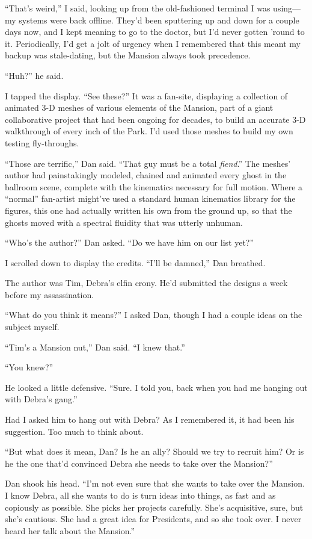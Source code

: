 “That's weird,” I said, looking up from the old-fashioned terminal
I was using—my systems were back offline. They'd been sputtering up
and down for a couple days now, and I kept meaning to go to the
doctor, but I'd never gotten 'round to it. Periodically, I'd get a
jolt of urgency when I remembered that this meant my backup was
stale-dating, but the Mansion always took precedence.

“Huh?” he said.

I tapped the display. “See these?” It was a fan-site, displaying a
collection of animated 3-D meshes of various elements of the
Mansion, part of a giant collaborative project that had been
ongoing for decades, to build an accurate 3-D walkthrough of every
inch of the Park. I'd used those meshes to build my own testing
fly-throughs.

“Those are terrific,” Dan said. “That guy must be a total
\emph{fiend}.” The meshes' author had painstakingly modeled,
chained and animated every ghost in the ballroom scene, complete
with the kinematics necessary for full motion. Where a “normal”
fan-artist might've used a standard human kinematics library for
the figures, this one had actually written his own from the ground
up, so that the ghosts moved with a spectral fluidity that was
utterly unhuman.

“Who's the author?” Dan asked. “Do we have him on our list yet?”

I scrolled down to display the credits. “I'll be damned,” Dan
breathed.

The author was Tim, Debra's elfin crony. He'd submitted the designs
a week before my assassination.

“What do you think it means?” I asked Dan, though I had a couple
ideas on the subject myself.

“Tim's a Mansion nut,” Dan said. “I knew that.”

“You knew?”

He looked a little defensive. “Sure. I told you, back when you had
me hanging out with Debra's gang.”

Had I asked him to hang out with Debra? As I remembered it, it had
been his suggestion. Too much to think about.

“But what does it mean, Dan? Is he an ally? Should we try to
recruit him? Or is he the one that'd convinced Debra she needs to
take over the Mansion?”

Dan shook his head. “I'm not even sure that she wants to take over
the Mansion. I know Debra, all she wants to do is turn ideas into
things, as fast and as copiously as possible. She picks her
projects carefully. She's acquisitive, sure, but she's cautious.
She had a great idea for Presidents, and so she took over. I never
heard her talk about the Mansion.”

